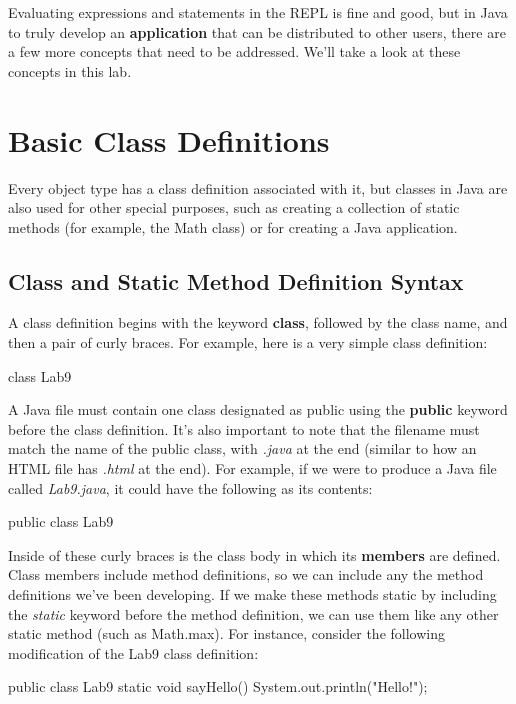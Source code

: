 Evaluating expressions and statements in the REPL is fine and good, but in Java to truly develop an \textbf{application} that can be distributed to other users, there are a few more concepts that need to be addressed. We'll take a look at these concepts in this lab.

\section{Basic Class Definitions}

Every object type has a class definition associated with it, but classes in Java are also used for other special purposes, such as creating a collection of static methods (for example, the Math class) or for creating a Java application. 

\subsection{Class and Static Method Definition Syntax}

A class definition begins with the keyword \textbf{class}, followed by the class name, and then a pair of curly braces. For example, here is a very simple class definition:

\begin{code}
class Lab9 {
}
\end{code}

A Java file must contain one class designated as public using the \textbf{public} keyword before the class definition. It's also important to note that the filename must match the name of the public class, with \textit{.java} at the end (similar to how an HTML file has \textit{.html} at the end). For example, if we were to produce a Java file called \textit{Lab9.java}, it could have the following as its contents:

\begin{code}
public class Lab9 {
}
\end{code}

Inside of these curly braces is the class body in which its \textbf{members} are defined. Class members include method definitions, so we can include any the method definitions we've been developing. If we make these methods static by including the \textit{static} keyword before the method definition, we can use them like any other static method (such as Math.max). For instance, consider the following modification of the Lab9 class definition:


\begin{code}
public class Lab9 {
  static void sayHello() {
    System.out.println("Hello!");
  }
}
\end{code}

